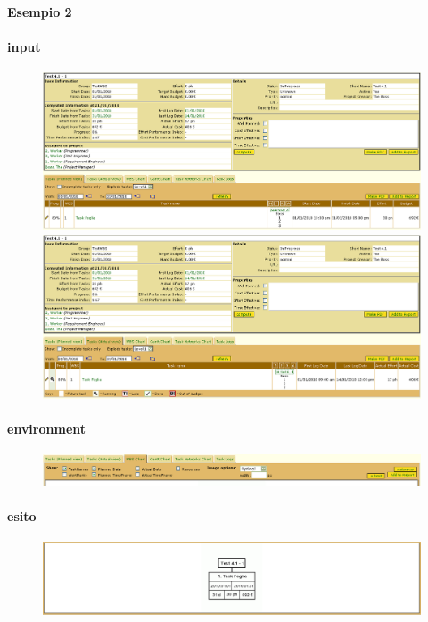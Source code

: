 \paragraph{Esempio 2}
\paragraph{input}
\begin{figure}
\centering
\includegraphics[width=\textwidth]{tests/TEST_WBS/4.1/4.1_1/Esempio_2/input.png}
\includegraphics[width=\textwidth]{tests/TEST_WBS/4.1/4.1_1/Esempio_2/input_actual.png}
\end{figure}
\newpage
\paragraph{environment}
\begin{figure}
\centering
\includegraphics[width=\textwidth]{tests/TEST_WBS/4.1/4.1_1/Esempio_2/environment.png}
\end{figure}
\paragraph{esito}
\begin{figure}
\centering
\includegraphics[width=\textwidth]{tests/TEST_WBS/4.1/4.1_1/Esempio_2/output.png}
\end{figure}

